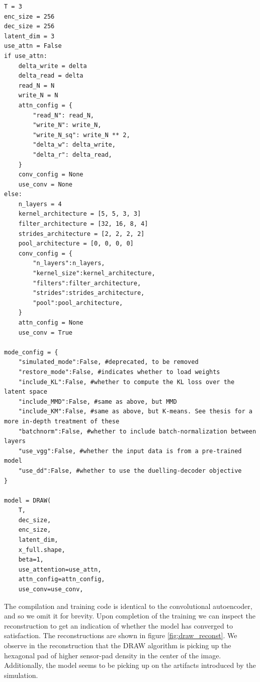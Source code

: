 \begin{minipage}{\linewidth}
\begin{lstlisting}[language=iPython]
T = 3
enc_size = 256
dec_size = 256
latent_dim = 3
use_attn = False
if use_attn:
    delta_write = delta
    delta_read = delta
    read_N = N
    write_N = N
    attn_config = {
        "read_N": read_N,
        "write_N": write_N,
        "write_N_sq": write_N ** 2,
        "delta_w": delta_write,
        "delta_r": delta_read,
    }
    conv_config = None
    use_conv = None
else:
    n_layers = 4
    kernel_architecture = [5, 5, 3, 3]
    filter_architecture = [32, 16, 8, 4]
    strides_architecture = [2, 2, 2, 2]
    pool_architecture = [0, 0, 0, 0]
    conv_config = {
        "n_layers":n_layers,
        "kernel_size":kernel_architecture,
        "filters":filter_architecture,
        "strides":strides_architecture,
        "pool":pool_architecture,
    }
    attn_config = None
    use_conv = True
    
mode_config = {
    "simulated_mode":False, #deprecated, to be removed
    "restore_mode":False, #indicates whether to load weights 
    "include_KL":False, #whether to compute the KL loss over the latent space
    "include_MMD":False, #same as above, but MMD 
    "include_KM":False, #same as above, but K-means. See thesis for a more in-depth treatment of these
    "batchnorm":False, #whether to include batch-normalization between layers
    "use_vgg":False, #whether the input data is from a pre-trained model 
    "use_dd":False, #whether to use the duelling-decoder objective 
}

model = DRAW(
    T,
    dec_size,
    enc_size,
    latent_dim,
    x_full.shape,
    beta=1,
    use_attention=use_attn,
    attn_config=attn_config,
    use_conv=use_conv,

\end{lstlisting}
\end{minipage}

\noindent The compilation and training code is identical to the convolutional autoencoder, and so we omit it for brevity. Upon completion of the training we can inspect the reconstruction to get an indication of whether the model has converged to satisfaction. The reconstructions are shown in figure \ref{fig:draw_reconst}. We observe in the reconstruction that the DRAW algorithm is picking up the hexagonal pad of higher sensor-pad density in the center of the image. Additionally, the model seems to be picking  up on the artifacts introduced by the simulation.

